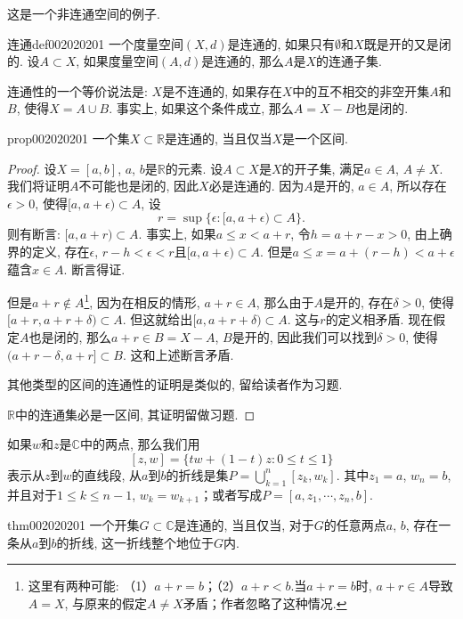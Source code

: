 这是一个非连通空间的例子. 

\begin{definition}{连通}{def002020201}
一个度量空间$(X, d)$是连通的, 如果只有$\emptyset$和$X$既是开的又是闭的. 设$A \subset X$, 如果度量空间$(A, d)$是连通的, 那么$A$是$X$的连通子集. 
\end{definition}

连通性的一个等价说法是: $X$是不连通的, 如果存在$X$中的互不相交的非空开集$A$和$B$, 使得$X = A \cup B$. 事实上, 如果这个条件成立, 那么$A = X-B$也是闭的. 

\begin{proposition}{}{prop002020201}
一个集$X \subset \mathbb{R}$是连通的, 当且仅当$X$是一个区间. 
\end{proposition}

\begin{proof}
设$X = [a, b]$, $a$, $b$是$\mathbb{R}$的元素. 设$A \subset X$是$X$的开子集, 满足$a \in A$, $A \neq X$. 我们将证明$A$不可能也是闭的, 因此$X$必是连通的. 因为$A$是开的, $a \in A$, 所以存在$\epsilon > 0$, 使得$[a, a+\epsilon) \subset A$, 设
\[
r = \sup\{\epsilon: [a, a+\epsilon) \subset A\}.
\]
则有断言: $[a, a+r) \subset A$. 事实上, 如果$a \le x < a+r$, 令$h = a + r -x > 0$, 由上确界的定义, 存在$\epsilon$, $r - h < \epsilon < r$且$[a, a+\epsilon) \subset A$. 但是$a \le x = a + (r-h) < a + \epsilon$蕴含$x \in A$. 断言得证. 

但是$a + r \not\in A$\footnote{这里有两种可能: （1）$a+r=b$；（2）$a+r < b$.当$a+r=b$时, $a + r \in A$导致$A=X$, 与原来的假定$A \neq X$矛盾；作者忽略了这种情况. }, 因为在相反的情形, $a + r \in A$, 那么由于$A$是开的, 存在$\delta > 0$, 使得$[a + r, a+r+\delta) \subset A$. 但这就给出$[a, a+r+\delta) \subset A$. 这与$r$的定义相矛盾. 现在假定$A$也是闭的, 那么$a + r \in B = X- A$, $B$是开的, 因此我们可以找到$\delta > 0$, 使得$(a+r-\delta, a+r] \subset B$. 这和上述断言矛盾. 

其他类型的区间的连通性的证明是类似的, 留给读者作为习题. 

$\mathbb{R}$中的连通集必是一区间, 其证明留做习题. 
\end{proof}

如果$w$和$z$是$\mathbb{C}$中的两点, 那么我们用
\[
[z, w] = \{tw + (1-t)z:0 \le t \le 1\}
\]
表示从$z$到$w$的直线段, 从$a$到$b$的折线是集$P = \bigcup_{k=1}^{n}{[z_k, w_k]}$. 其中$z_1 = a$, $w_n = b$, 并且对于$1 \le k \le n-1$, $w_k = w_{k+1}$；或者写成$P=[a,z_1,\cdots, z_n, b]$. 

\begin{theorem}{}{thm002020201}
一个开集$G \subset \mathbb{C}$是连通的, 当且仅当, 对于$G$的任意两点$a$, $b$, 存在一条从$a$到$b$的折线, 这一折线整个地位于$G$内. 
\end{theorem}

